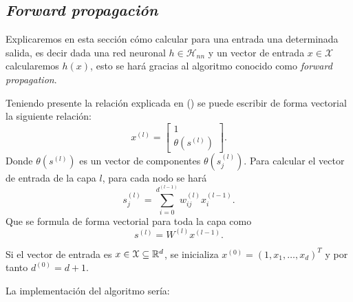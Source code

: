 \subsection{ \textit{Forward propagación}}

Explicaremos en esta sección cómo calcular para una entrada una determinada salida, es decir
dada una red neuronal $h \in \mathcal{H}_{n n}$ y un vector de entrada $x \in \mathcal{X}$ calcularemos  $h(x)$, esto se hará gracias al algoritmo conocido como \textit{forward propagation}.

Teniendo presente la relación  explicada en () se puede escribir de forma vectorial la siguiente relación: 
\begin{equation}
    x^{(l)} = 
    \left[ \begin{array}{c}
        1 \\
       \theta(s^{(l)})
        \end{array}
\right] .
\end{equation}
Donde $\theta(s^{(l)})$ es un vector de componentes $\theta(s^{(l)}_j)$. 
Para calcular el vector de entrada de la capa $l$, para cada nodo se hará
\begin{equation}
    s_j^{(l)} = \sum_{i=0}^{d^{(l-1)}} w_{i j}^{(l)}x_i^{(l-1)}.
\end{equation}
Que se formula de forma vectorial para toda la capa como 
\begin{equation}
    s^{(l)} = W^{(l)} x^{(l-1)}.
\end{equation}

Si el vector de entrada es $x \in \mathcal{X} \subseteq \mathbb{R}^d$, 
se inicializa  $x^{(0)} = (1,x_1, \ldots, x_d)^T$ y por tanto $d^{(0)} = d+1.$


La implementación del algoritmo sería:

